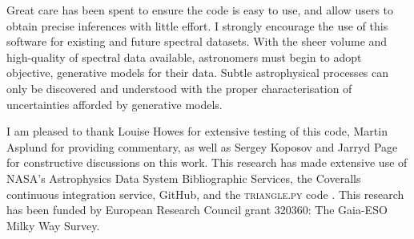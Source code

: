 \documentclass[iop]{emulateapj}
\begin{document}
Great care has been spent to ensure the code is easy to use, and allow users to 
obtain precise inferences with little effort. I strongly encourage the use of this 
software for existing and future spectral datasets. With the sheer volume and 
high-quality of spectral data available, astronomers must begin to adopt objective, 
generative models for their data. Subtle astrophysical processes can only be 
discovered and understood with the proper characterisation of uncertainties 
afforded by generative models.

\acknowledgements
I am pleased to thank Louise Howes for extensive testing of this code, Martin 
Asplund for providing commentary, as well as Sergey Koposov and Jarryd Page for 
constructive discussions on this work. This research has made extensive use of NASA's 
Astrophysics Data System Bibliographic Services, the Coveralls continuous 
integration service, GitHub, and the \textsc{triangle.py} code \citep{triangle.py}.
This research has been funded by European Research Council grant 320360: 
The Gaia-ESO Milky Way Survey. 




\end{document}
